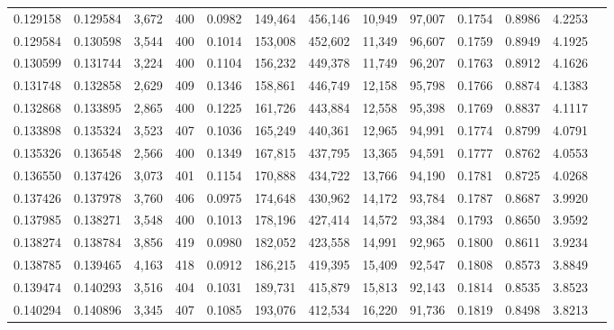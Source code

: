 \begin{tabular}{rrrrrrrrrrrrr}
0.129158 & 0.129584 & 3,672 & 400 &                                     0.0982 & 149,464 & 456,146 &  10,949 &  97,007 & 0.1754 & 0.8986 & 4.2253 \\
0.129584 & 0.130598 & 3,544 & 400 &                                     0.1014 & 153,008 & 452,602 &  11,349 &  96,607 & 0.1759 & 0.8949 & 4.1925 \\
0.130599 & 0.131744 & 3,224 & 400 &                                     0.1104 & 156,232 & 449,378 &  11,749 &  96,207 & 0.1763 & 0.8912 & 4.1626 \\
0.131748 & 0.132858 & 2,629 & 409 &                                     0.1346 & 158,861 & 446,749 &  12,158 &  95,798 & 0.1766 & 0.8874 & 4.1383 \\
0.132868 & 0.133895 & 2,865 & 400 &                                     0.1225 & 161,726 & 443,884 &  12,558 &  95,398 & 0.1769 & 0.8837 & 4.1117 \\
0.133898 & 0.135324 & 3,523 & 407 &                                     0.1036 & 165,249 & 440,361 &  12,965 &  94,991 & 0.1774 & 0.8799 & 4.0791 \\
0.135326 & 0.136548 & 2,566 & 400 &                                     0.1349 & 167,815 & 437,795 &  13,365 &  94,591 & 0.1777 & 0.8762 & 4.0553 \\
0.136550 & 0.137426 & 3,073 & 401 &                                     0.1154 & 170,888 & 434,722 &  13,766 &  94,190 & 0.1781 & 0.8725 & 4.0268 \\
0.137426 & 0.137978 & 3,760 & 406 &                                     0.0975 & 174,648 & 430,962 &  14,172 &  93,784 & 0.1787 & 0.8687 & 3.9920 \\
0.137985 & 0.138271 & 3,548 & 400 &                                     0.1013 & 178,196 & 427,414 &  14,572 &  93,384 & 0.1793 & 0.8650 & 3.9592 \\
0.138274 & 0.138784 & 3,856 & 419 &                                     0.0980 & 182,052 & 423,558 &  14,991 &  92,965 & 0.1800 & 0.8611 & 3.9234 \\
0.138785 & 0.139465 & 4,163 & 418 &                                     0.0912 & 186,215 & 419,395 &  15,409 &  92,547 & 0.1808 & 0.8573 & 3.8849 \\
0.139474 & 0.140293 & 3,516 & 404 &                                     0.1031 & 189,731 & 415,879 &  15,813 &  92,143 & 0.1814 & 0.8535 & 3.8523 \\
0.140294 & 0.140896 & 3,345 & 407 &                                     0.1085 & 193,076 & 412,534 &  16,220 &  91,736 & 0.1819 & 0.8498 & 3.8213 \\

\end{tabular}
